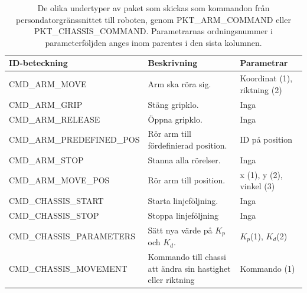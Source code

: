 \begin{table}[H]
\label{commands}
\begin{tabularx}{\textwidth}{|l|X|X|}
\hline
\textbf{ID-beteckning} & \textbf{Beskrivning} & \textbf{Parametrar} \\ \hline
CMD\_ARM\_MOVE & Arm ska röra sig. & Koordinat (1), riktning (2) \\ \hline
CMD\_ARM\_GRIP & Stäng gripklo. & Inga \\ \hline
CMD\_ARM\_RELEASE & Öppna gripklo. & Inga \\ \hline
CMD\_ARM\_PREDEFINED\_POS & Rör arm till fördefinierad position. & ID på position \\ \hline
CMD\_ARM\_STOP & Stanna alla rörelser. & Inga \\ \hline
CMD\_ARM\_MOVE\_POS & Rör arm till position. & x (1), y (2), vinkel (3) \\ \hline
CMD\_CHASSIS\_START & Starta linjeföljning. & Inga \\ \hline
CMD\_CHASSIS\_STOP & Stoppa linjeföljning & Inga \\ \hline
CMD\_CHASSIS\_PARAMETERS & Sätt nya värde på $K_p$ och $K_d$. & $K_p$(1), $K_d$(2) \\ \hline
CMD\_CHASSIS\_MOVEMENT & Kommando till chassi att ändra sin hastighet eller riktning & Kommando (1) \\ \hline
\end{tabularx}
\caption{De olika undertyper av paket som skickas som kommandon från persondatorgränssnittet till roboten, genom PKT\_ARM\_COMMAND eller PKT\_CHASSIS\_COMMAND. Parametrarnas ordningsnummer i parameterföljden anges inom parentes i den sista kolumnen.}
\end{table}

